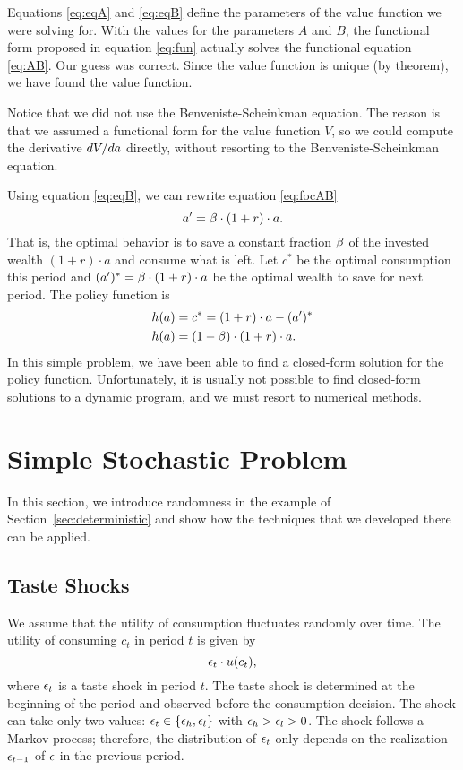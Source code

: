 \documentclass[letterpaper,12pt,leqno]{article}
\begin{document}
Equations \eqref{eq:eqA} and \eqref{eq:eqB} define the parameters of the value function we were solving for. With the values for the parameters $A$ and $B$, the functional form proposed in equation \eqref{eq:fun} actually solves the functional equation \eqref{eq:AB}. Our guess was correct. Since the value function is unique (by theorem), we have found the value function.

Notice that we did not use the Benveniste-Scheinkman equation. The reason is that we assumed a functional form for the value function $V$, so we could compute the derivative  $d V/d a$  directly, without resorting to the Benveniste-Scheinkman equation.


Using equation \eqref{eq:eqB}, we can rewrite equation \eqref{eq:focAB}
\begin{equation*}
a'=\beta  \cdot (1+r)\cdot a.
\end{equation*}
That is, the optimal behavior is to save a constant fraction $\beta$ of the invested wealth $(1+r)\cdot a$ and consume what is left. Let $c^{*}$  be the optimal consumption this period and $(a')^*=\beta \cdot (1+r)\cdot a $  be the optimal wealth to save for next period. The policy function is
\begin{align*}
h(a)&=c^*=(1+r)\cdot a-(a')^*\\
h(a)&=(1-\beta)\cdot  (1+r)\cdot a.
\end{align*}
In this simple problem, we have been able to find a closed-form solution for the policy function. Unfortunately, it is usually not possible to find closed-form solutions to a dynamic program, and we must resort to numerical methods. 


\section{Simple Stochastic Problem}\label{sec:stochastic}

In this section, we introduce randomness in the example of Section~\ref{sec:deterministic} and show how the techniques that we developed there can be applied.

\subsection{Taste Shocks}

We assume that the utility of consumption fluctuates randomly over time. The utility of consuming $c_{t}$ in period $t$ is given by
\begin{equation*}
\epsilon_t \cdot u(c_t),
\end{equation*}
where $\epsilon_t$ is a taste shock in period $t$. The taste shock is determined at the beginning of the period and observed before the consumption decision. The shock can take only two values: $\epsilon_{t}\in\{\epsilon_h,\epsilon_l\}$ with $\epsilon_h>\epsilon_l>0$. The shock follows a Markov process; therefore, the distribution of $\epsilon_t$ only depends on the realization $\epsilon_{t-1}$ of $\epsilon$ in the previous period. 
\end{document}

